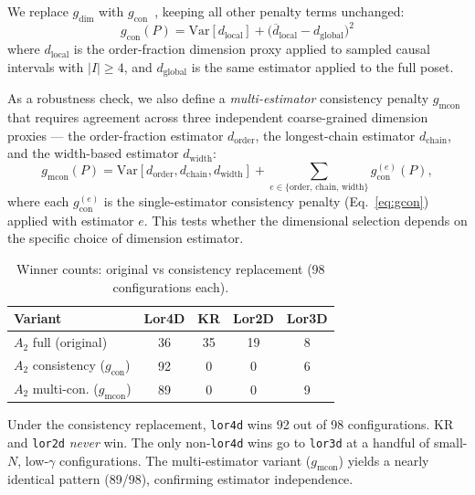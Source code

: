 \documentclass[entropy,article,submit,pdftex,moreauthors]{Definitions/mdpi}
\begin{document}
We replace $g_{\text{dim}}$ with $g_{\text{con}}$~\cite{zhang2026companion}, keeping all other penalty terms unchanged:
\begin{equation}
    g_{\text{con}}(P) = \text{Var}[d_{\text{local}}] + \bigl(\overline{d}_{\text{local}} - d_{\text{global}}\bigr)^2
    \label{eq:gcon}
\end{equation}
where $d_{\text{local}}$ is the order-fraction dimension proxy applied to sampled causal intervals with $|I| \geq 4$, and $d_{\text{global}}$ is the same estimator applied to the full poset.

As a robustness check, we also define a \emph{multi-estimator} consistency penalty $g_{\text{mcon}}$ that requires agreement across three independent coarse-grained dimension proxies --- the order-fraction estimator $d_{\text{order}}$, the longest-chain estimator $d_{\text{chain}}$, and the width-based estimator $d_{\text{width}}$:
\begin{equation}
    g_{\text{mcon}}(P) = \text{Var}[d_{\text{order}}, d_{\text{chain}}, d_{\text{width}}] + \sum_{e \in \{\text{order, chain, width}\}} g_{\text{con}}^{(e)}(P),
    \label{eq:gmcon}
\end{equation}
where each $g_{\text{con}}^{(e)}$ is the single-estimator consistency penalty (Eq.~\ref{eq:gcon}) applied with estimator $e$. This tests whether the dimensional selection depends on the specific choice of dimension estimator.

\begin{table}[H]
\caption{Winner counts: original vs consistency replacement (98 configurations each).\label{tab:replacement}}
\begin{tabular}{lcccc}
\toprule
\textbf{Variant} & \textbf{Lor4D} & \textbf{KR} & \textbf{Lor2D} & \textbf{Lor3D} \\
\midrule
$A_2$ full (original) & 36 & 35 & 19 & 8 \\
$A_2$ consistency ($g_{\text{con}}$) & 92 & 0 & 0 & 6 \\
$A_2$ multi-con. ($g_{\text{mcon}}$) & 89 & 0 & 0 & 9 \\
\bottomrule
\end{tabular}
\end{table}

Under the consistency replacement, \texttt{lor4d} wins 92 out of 98 configurations. KR and \texttt{lor2d} \emph{never} win. The only non-\texttt{lor4d} wins go to \texttt{lor3d} at a handful of small-$N$, low-$\gamma$ configurations. The multi-estimator variant ($g_{\text{mcon}}$) yields a nearly identical pattern (89/98), confirming estimator independence.
\end{document}
